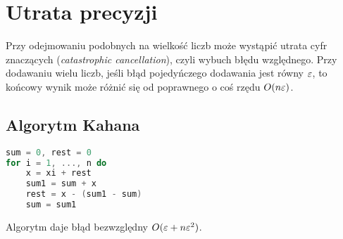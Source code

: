 \section{Utrata precyzji}
Przy odejmowaniu podobnych na wielkość liczb może wystąpić utrata cyfr znaczących \linebreak (\textit{catastrophic cancellation}), czyli wybuch błędu względnego. Przy dodawaniu wielu liczb, jeśli błąd pojedyńczego dodawania jest równy \( \varepsilon \), to końcowy wynik może różnić się od poprawnego \linebreak o coś rzędu \( O(n \varepsilon) \).

\subsection{Algorytm Kahana}
\begin{multicols}{2}
\begin{lstlisting}[language=Cpp]
sum = 0, rest = 0
for i = 1, ..., n do
    x = xi + rest
    sum1 = sum + x
    rest = x - (sum1 - sum)
    sum = sum1
\end{lstlisting}
\columnbreak
Algorytm daje błąd bezwzględny \( O(\varepsilon + n\varepsilon^2) \).
\end{multicols}
